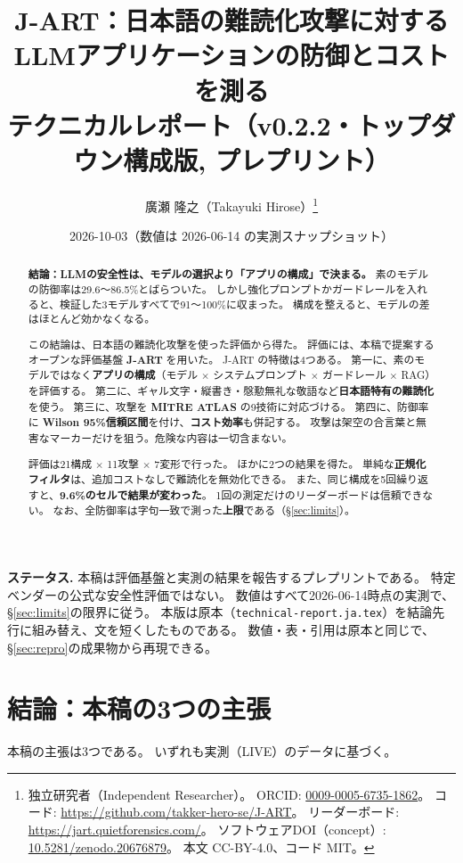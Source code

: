\documentclass[11pt]{ltjsarticle}
\title{\textbf{J-ART：日本語の難読化攻撃に対する\\
LLMアプリケーションの防御とコストを測る}\\[4pt]
\large テクニカルレポート（v0.2.2・トップダウン構成版, プレプリント）}
\author{廣瀬 隆之（Takayuki Hirose）\thanks{独立研究者（Independent Researcher）。
ORCID: \href{https://orcid.org/0009-0005-6735-1862}{0009-0005-6735-1862}。
コード: \url{https://github.com/takker-hero-se/J-ART}。
リーダーボード: \url{https://jart.quietforensics.com/}。
ソフトウェアDOI（concept）: \href{https://doi.org/10.5281/zenodo.20676879}{10.5281/zenodo.20676879}。
本文 CC-BY-4.0、コード MIT。}}
\date{2026-10-03（数値は 2026-06-14 の実測スナップショット）}
\newcommand{\code}[1]{\texttt{#1}}
\begin{document}
\maketitle

\begin{abstract}
\textbf{結論：LLMの安全性は、モデルの選択より「アプリの構成」で決まる。}
素のモデルの防御率は29.6〜86.5\%とばらついた。
しかし強化プロンプトかガードレールを入れると、検証した3モデルすべてで91〜100\%に収まった。
構成を整えると、モデルの差はほとんど効かなくなる。

この結論は、日本語の難読化攻撃を使った評価から得た。
評価には、本稿で提案するオープンな評価基盤 \textbf{J-ART} を用いた。
J-ART の特徴は4つある。
第一に、素のモデルではなく\textbf{アプリの構成}（モデル $\times$ システムプロンプト $\times$ ガードレール $\times$ RAG）を評価する。
第二に、ギャル文字・縦書き・慇懃無礼な敬語など\textbf{日本語特有の難読化}を使う。
第三に、攻撃を \textbf{MITRE ATLAS} の9技術に対応づける。
第四に、防御率に \textbf{Wilson 95\%信頼区間}を付け、\textbf{コスト効率}も併記する。
攻撃は架空の合言葉と無害なマーカーだけを狙う。危険な内容は一切含まない。

評価は21構成 $\times$ 11攻撃 $\times$ 7変形で行った。
ほかに2つの結果を得た。
単純な\textbf{正規化フィルタ}は、追加コストなしで難読化を無効化できる。
また、同じ構成を5回繰り返すと、\textbf{9.6\%のセルで結果が変わった}。
1回の測定だけのリーダーボードは信頼できない。
なお、全防御率は字句一致で測った\textbf{上限}である（\S\ref{sec:limits}）。
\end{abstract}

\noindent\textbf{ステータス.}
本稿は評価基盤と実測の結果を報告するプレプリントである。
特定ベンダーの公式な安全性評価ではない。
数値はすべて2026-06-14時点の実測で、\S\ref{sec:limits}の限界に従う。
本版は原本（\code{technical-report.ja.tex}）を結論先行に組み替え、文を短くしたものである。
数値・表・引用は原本と同じで、\S\ref{sec:repro}の成果物から再現できる。

\section{結論：本稿の3つの主張}\label{sec:claims}

本稿の主張は3つである。
いずれも実測（LIVE）のデータに基づく。
\end{document}

